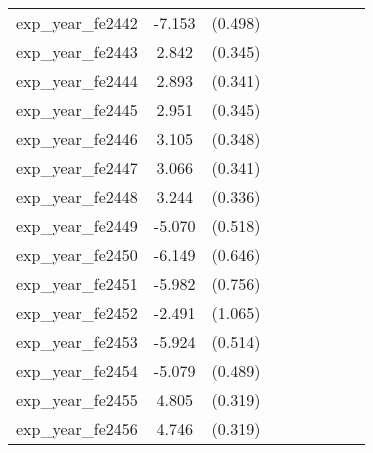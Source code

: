 {\begin{tabular}{l*{4}{cc}}
exp\_year\_fe2442&   -7.153\sym{***}&  (0.498)&                  &         &                  &         &                  &         \\
exp\_year\_fe2443&    2.842\sym{***}&  (0.345)&                  &         &                  &         &                  &         \\
exp\_year\_fe2444&    2.893\sym{***}&  (0.341)&                  &         &                  &         &                  &         \\
exp\_year\_fe2445&    2.951\sym{***}&  (0.345)&                  &         &                  &         &                  &         \\
exp\_year\_fe2446&    3.105\sym{***}&  (0.348)&                  &         &                  &         &                  &         \\
exp\_year\_fe2447&    3.066\sym{***}&  (0.341)&                  &         &                  &         &                  &         \\
exp\_year\_fe2448&    3.244\sym{***}&  (0.336)&                  &         &                  &         &                  &         \\
exp\_year\_fe2449&   -5.070\sym{***}&  (0.518)&                  &         &                  &         &                  &         \\
exp\_year\_fe2450&   -6.149\sym{***}&  (0.646)&                  &         &                  &         &                  &         \\
exp\_year\_fe2451&   -5.982\sym{***}&  (0.756)&                  &         &                  &         &                  &         \\
exp\_year\_fe2452&   -2.491\sym{*}  &  (1.065)&                  &         &                  &         &                  &         \\
exp\_year\_fe2453&   -5.924\sym{***}&  (0.514)&                  &         &                  &         &                  &         \\
exp\_year\_fe2454&   -5.079\sym{***}&  (0.489)&                  &         &                  &         &                  &         \\
exp\_year\_fe2455&    4.805\sym{***}&  (0.319)&                  &         &                  &         &                  &         \\
exp\_year\_fe2456&    4.746\sym{***}&  (0.319)&                  &         &                  &         &                  &         \\

\end{tabular}}
